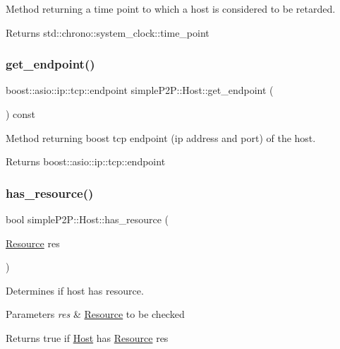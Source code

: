 Method returning a time point to which a host is considered to be retarded. 

\begin{DoxyReturn}{Returns}
std\+::chrono\+::system\+\_\+clock\+::time\+\_\+point 
\end{DoxyReturn}
\mbox{\label{classsimpleP2P_1_1Host_a25780ee00b380a84ad0a3312bfa635cb}} 
\subsubsection{\texorpdfstring{get\+\_\+endpoint()}{get\_endpoint()}}
{\footnotesize\ttfamily boost\+::asio\+::ip\+::tcp\+::endpoint simple\+P2\+P\+::\+Host\+::get\+\_\+endpoint (\begin{DoxyParamCaption}{ }\end{DoxyParamCaption}) const}



Method returning boost tcp endpoint (ip address and port) of the host. 

\begin{DoxyReturn}{Returns}
boost\+::asio\+::ip\+::tcp\+::endpoint 
\end{DoxyReturn}
\mbox{\label{classsimpleP2P_1_1Host_a5d4b48eaf05f5353816aae78cbd29c64}} 
\subsubsection{\texorpdfstring{has\+\_\+resource()}{has\_resource()}}
{\footnotesize\ttfamily bool simple\+P2\+P\+::\+Host\+::has\+\_\+resource (\begin{DoxyParamCaption}\item[{\hyperlink{classsimpleP2P_1_1Resource}{Resource}}]{res }\end{DoxyParamCaption})}



Determines if host has resource. 


\begin{DoxyParams}{Parameters}
{\em res} & \hyperlink{classsimpleP2P_1_1Resource}{Resource} to be checked \\
\hline
\end{DoxyParams}
\begin{DoxyReturn}{Returns}
true if \hyperlink{classsimpleP2P_1_1Host}{Host} has \hyperlink{classsimpleP2P_1_1Resource}{Resource} res 
\end{DoxyReturn}
\mbox{\label{classsimpleP2P_1_1Host_afcd858f4c6a7496b6164e36a5192f1db}} 
